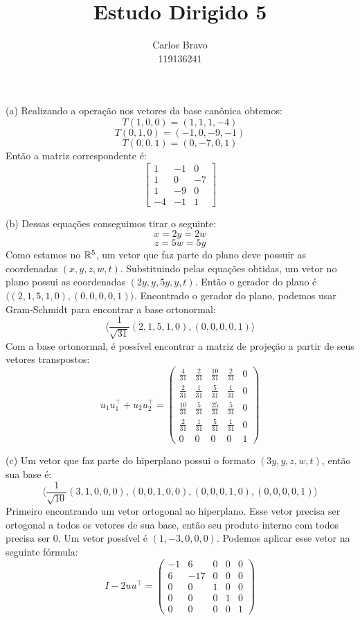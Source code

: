 \documentclass{homework}
\title{Estudo Dirigido 5}
\author{Carlos Bravo\\ 119136241}
\begin{document}
\maketitle

\exercise
(a) Realizando a operação nos vetores da base canônica obtemos:
\[T(1,0,0) = (1,1,1,-4)\]
\[T(0,1,0) = (-1,0,-9,-1)\]
\[T(0,0,1) = (0,-7,0,1)\]
Então a matriz correspondente é:
\[\begin{bmatrix}
1 & -1 & 0\\
1 & 0 & -7\\
1 & -9 & 0\\
-4 & -1 & 1
\end{bmatrix}\]

(b) Dessas equações conseguimos tirar o seguinte:
\[x = 2y = 2w\]
\[z = 5w = 5y\]
Como estamos no $\mathbb R^5$, um vetor que faz parte do plano deve possuir as coordenadas $(x,y,z,w,t)$. Substituindo pelas equações obtidas, um vetor no plano possui as coordenadas $(2y,y,5y,y,t)$. Então o gerador do plano é $\langle(2,1,5,1,0),(0,0,0,0,1)\rangle$. Encontrado o gerador do plano, podemos usar Gram-Schmidt para encontrar a base ortonormal:
\[\langle\frac{1}{\sqrt{31}}(2,1,5,1,0),(0,0,0,0,1)\rangle\]
Com a base ortonormal, é possível encontrar a matriz de projeção a partir de seus vetores transpostos:
\[u_1u_1^\top + u_2u_2^\top =
\begin{pmatrix}\frac{4}{31} & \frac{2}{31} & \frac{10}{31} & \frac{2}{31} & 0\\
\frac{2}{31} & \frac{1}{31} & \frac{5}{31} & \frac{1}{31} & 0\\
\frac{10}{31} & \frac{5}{31} & \frac{25}{31} & \frac{5}{31} & 0\\
\frac{2}{31} & \frac{1}{31} & \frac{5}{31} & \frac{1}{31} & 0\\
0 & 0 & 0 & 0 & 1\end{pmatrix}\]


(c) Um vetor que faz parte do hiperplano possui o formato $(3y,y,z,w,t)$, então sua base é:
\[\langle\frac{1}{\sqrt{10}}(3,1,0,0,0),(0,0,1,0,0),(0,0,0,1,0),(0,0,0,0,1)\rangle\]
Primeiro encontrando um vetor ortogonal ao hiperplano. Esse vetor precisa ser ortogonal a todos os vetores de sua base, então seu produto interno com todos precisa ser 0. Um vetor possível é $(1,-3,0,0,0)$. Podemos aplicar esse vetor na seguinte fórmula:
\[I - 2uu^\top = 
\begin{pmatrix}-1 & 6 & 0 & 0 & 0\\
6 & -17 & 0 & 0 & 0\\
0 & 0 & 1 & 0 & 0\\
0 & 0 & 0 & 1 & 0\\
0 & 0 & 0 & 0 & 1\end{pmatrix}\]
\end{document}
